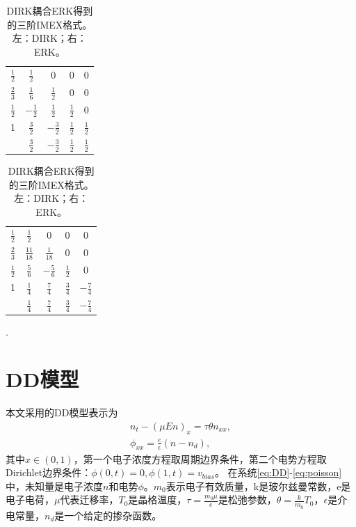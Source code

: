\begin{table}
    \centering
    \begin{minipage}{0.45\linewidth}
        \centering
        \begin{tabular}{c|cccc}
            $\frac{1}{2}$ & $\frac{1}{2}$  & 0              & 0             & 0             \\
            $\frac{2}{3}$ & $\frac{1}{6}$  & $\frac{1}{2}$  & 0             & 0             \\
            $\frac{1}{2}$ & $-\frac{1}{2}$ & $\frac{1}{2}$  & $\frac{1}{2}$ & 0             \\
            1             & $\frac{3}{2}$  & $-\frac{3}{2}$ & $\frac{1}{2}$ & $\frac{1}{2}$ \\
            \hline
                          & $\frac{3}{2}$  & $-\frac{3}{2}$ & $\frac{1}{2}$ & $\frac{1}{2}$
        \end{tabular}
    \end{minipage}
    \begin{minipage}{0.45\linewidth}
        \centering
        \begin{tabular}{c|cccc}
            $\frac{1}{2}$ & $\frac{1}{2}$   & 0              & 0             & 0              \\
            $\frac{2}{3}$ & $\frac{11}{18}$ & $\frac{1}{18}$ & 0             & 0              \\
            $\frac{1}{2}$ & $\frac{5}{6}$   & $-\frac{5}{6}$ & $\frac{1}{2}$ & 0              \\
            1             & $\frac{1}{4}$   & $\frac{7}{4}$  & $\frac{3}{4}$ & $-\frac{7}{4}$ \\
            \hline
                          & $\frac{1}{4}$   & $\frac{7}{4}$  & $\frac{3}{4}$ & $-\frac{7}{4}$
        \end{tabular}.
    \end{minipage}
    \caption{DIRK耦合ERK得到的三阶IMEX格式。左：DIRK；右：ERK。}
    \label{tab:IMEX3}
\end{table}

\section{DD模型}

本文采用的DD模型表示为
\begin{align}
    n_t - (\mu En)_x = \tau \theta n_{xx}, \label{eq:DD} \\
    \phi_{xx} = \frac{e}{\epsilon}(n - n_d),  \label{eq:poisson}
\end{align}
其中$x\in(0,1)$，第一个电子浓度方程取周期边界条件，第二个电势方程取Dirichlet边界条件：$\phi(0,t) = 0, \phi(1,t) = v_{bias}$。
在系统\eqref{eq:DD}-\eqref{eq:poisson}中，未知量是电子浓度$n$和电势$\phi$。$m_0$表示电子有效质量，k是玻尔兹曼常数，e是电子电荷，$\mu$代表迁移率，$T_0$是晶格温度，$\tau = \frac{m_0 \mu}{e}$是松弛参数，$\theta = \frac{k}{m_0}T_0$，$\epsilon$是介电常量，$n_d$是一个给定的掺杂函数。

